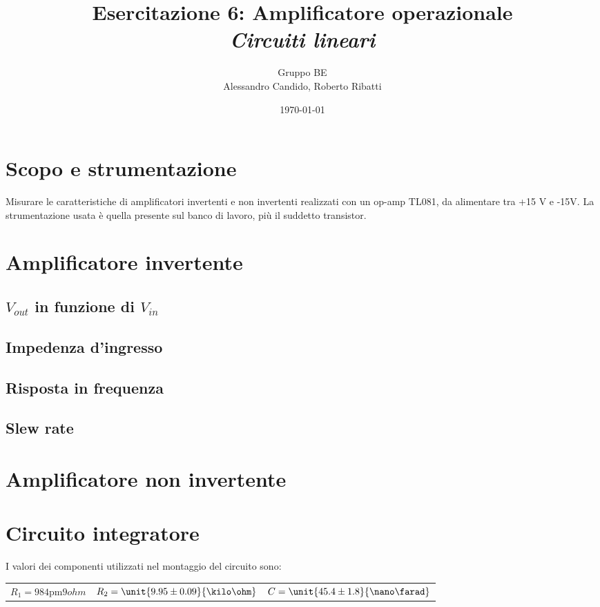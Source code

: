 \documentclass[10pt,a4paper]{article}
\title{Esercitazione 6: Amplificatore operazionale\\ \Large{\emph{Circuiti lineari}}}
\author{Gruppo BE \\ Alessandro Candido, Roberto Ribatti}
\date{\today}
\begin{document}
\maketitle

\section{Scopo e strumentazione}
Misurare le caratteristiche di amplificatori invertenti e non invertenti realizzati con un op-amp TL081, da alimentare tra +15 V e -15V.
La strumentazione usata è quella presente sul banco di lavoro, più il suddetto transistor.

\section{Amplificatore invertente}

\subsection{$V_{out}$ in funzione di $V_{in}$}

\subsection{Impedenza d'ingresso}

\subsection{Risposta in frequenza}

\subsection{Slew rate}

\section{Amplificatore non invertente}

\section{Circuito integratore}

I valori dei componenti utilizzati nel montaggio del circuito sono:

\begin{table}[h!]
\centering
\begin{tabular}{ccc}
$R_1 = \unit{984 \pm 9}{ohm}$	&	$R_2 = \unit{9.95 \pm 0.09}{\kilo\ohm}$	&	$C = \unit{45.4 \pm 1.8}{\nano\farad}$
\end{tabular}
\end{table}
\end{document}
